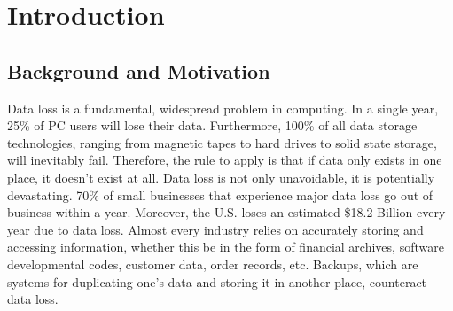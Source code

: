 \chapter{Introduction}

\section{Background and Motivation}
Data loss is a fundamental, widespread problem in computing. In a single year, 25\% of PC users will lose their data. Furthermore, 100\% of all data storage technologies, ranging from magnetic tapes to hard drives to solid state storage, will inevitably fail. \cite{imagineiti}  Therefore, the rule to apply is that if data only exists in one place, it doesn't exist at all.  Data loss is not only unavoidable, it is potentially devastating. 70\% of small businesses that experience major data loss go out of business within a year. \cite{imagineiti} Moreover, the U.S. loses an estimated \$18.2 Billion every year due to data loss. \cite{pepperdine} Almost every industry relies on accurately storing and accessing information, whether this be in the form of financial archives, software developmental codes, customer data, order records, etc. Backups, which are systems for duplicating one’s data and storing it in another place, counteract data loss.


